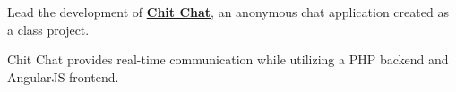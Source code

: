 \documentclass[]{deedy-resume-reversed}
\begin{document}
\begin{minipage}[t]{0.60\textwidth}
\begin{tightemize}
\item Lead the development of \textbf{\href{https://github.com/user/repo}{Chit Chat}}, an anonymous chat application created as a class project.
\item Chit Chat provides real-time communication while utilizing a PHP backend and AngularJS frontend.
\end{tightemize}
\sectionsep








\end{minipage}
\end{document}

